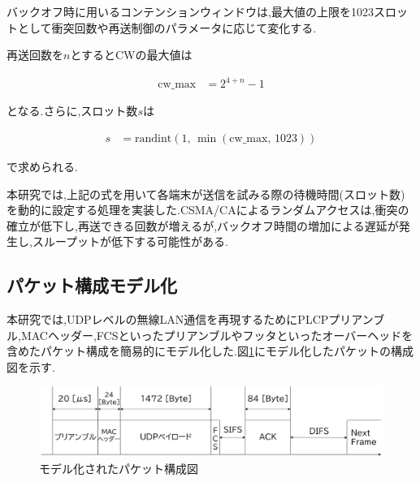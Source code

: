 \documentclass[a4paper, 10pt]{ltjsarticle}
\begin{document}
バックオフ時に用いるコンテンションウィンドウは,最大値の上限を1023スロットとして衝突回数や再送制御のパラメータに応じて変化する.

再送回数を$n$とするとCWの最大値は



\begin{align}
  \text{cw\_max} &= 2^{4 + n} - 1
\end{align}

となる.さらに,スロット数$s$は

\begin{align}
  s &= \mathrm{randint}(1, \, \min(\text{cw\_max}, \, 1023))
  \label{slot}
\end{align}

で求められる.

本研究では,上記の式を用いて各端末が送信を試みる際の待機時間(スロット数)を動的に設定する処理を実装した.CSMA/CAによるランダムアクセスは,衝突の確立が低下し,再送できる回数が増えるが,バックオフ時間の増加による遅延が発生し,スループットが低下する可能性がある.

\subsection{パケット構成モデル化}

本研究では,UDPレベルの無線LAN通信を再現するためにPLCPプリアンブル,MACヘッダー,FCSといったプリアンブルやフッタといったオーバーヘッドを含めたパケット構成を簡易的にモデル化した.図\ref{packet}にモデル化したパケットの構成図を示す.





\begin{figure}[H]
  \centering
  \includegraphics[width=1\columnwidth]{./assets/packet.png}
  \caption{モデル化されたパケット構成図}
  \label{packet}
\end{figure}


\end{document}
